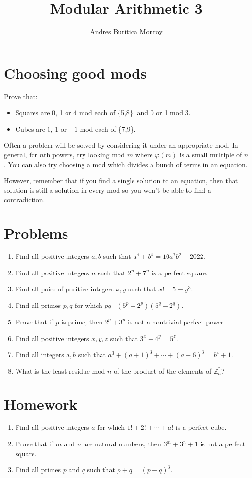 \documentclass{article}
\title{Modular Arithmetic 3}
\author{Andres Buritica Monroy}
\date{}
\begin{document}
\maketitle
\section{Choosing good mods}
  Prove that:
  \begin{itemize}
    \item Squares are 0, 1 or 4 mod each of \{5,8\}, and 0 or 1 mod 3.
    \item Cubes are 0, 1 or $-1$ mod each of \{7,9\}.
  \end{itemize}
  Often a problem will be solved by considering it under an appropriate mod.
  In general, for $n$th powers, try looking mod $m$ where $\varphi(m)$ is a
  small multiple of $n$.
  You can also try choosing a mod which divides a bunch of terms in an
  equation.

  However, remember that if you find a single solution to an equation, then that
  solution is still a solution in every mod so you won't be able to find a
  contradiction.
\section{Problems}
\begin{enumerate}
  \item Find all positive integers $a,b$ such that $a^4+b^4=10a^2b^2-2022$.
  \item Find all positive integers $n$ such that $2^n+7^n$ is a perfect square.
  \item Find all pairs of positive integers $x,y$ such that $x!+5=y^3$.
  \item Find all primes $p,q$ for which $pq\mid (5^p-2^p)(5^q-2^q)$.
  \item Prove that if $p$ is prime, then $2^p+3^p$ is not a nontrivial perfect
    power.
  \item Find all positive integers $x,y,z$ such that $3^x+4^y=5^z$.
  \item Find all integers $a,b$ such that $a^3+(a+1)^3+\cdots+(a+6)^3=b^4+1$.
  \item What is the least residue mod $n$ of the product of the elements of
    $\mathbb Z_n^*$?
\end{enumerate}
\newpage
\section{Homework}
\begin{enumerate}
  \item Find all positive integers $a$ for which $1!+2!+\cdots+a!$ is a perfect
    cube.
  \item Prove that if $m$ and $n$ are natural numbers, then $3^m+3^n+1$ is not a
    perfect square.
  \item Find all primes $p$ and $q$ such that $p+q=(p-q)^3$.
\end{enumerate}
\end{document}
